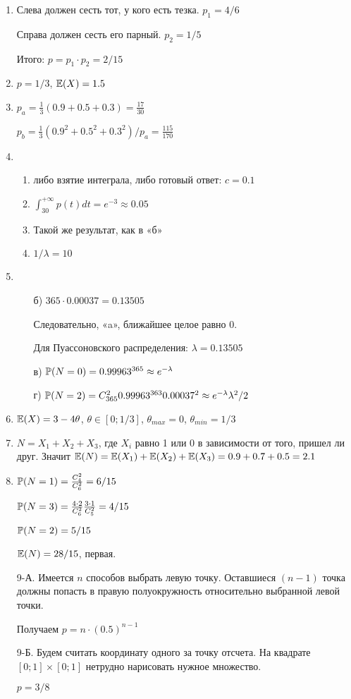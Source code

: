 \begin{enumerate}
\item Слева должен сесть тот, у кого есть тезка. $p_{1}=4/6$

Справа должен сесть его парный. $p_{2}=1/5$

Итого: $p=p_{1}\cdot p_{2}=2/15$
\item $p=1/3$, $\E(X)=1.5$
\item $p_{a}=\frac{1}{3}(0.9+0.5+0.3)=\frac{17}{30}$

$p_{b}=\frac{1}{3}(0.9^{2}+0.5^{2}+0.3^{2})/p_{a}=\frac{115}{170}$
\item
\begin{enumerate}
\item либо взятие интеграла, либо готовый ответ: $c=0.1$
\item $\int_{30}^{+\infty}p(t)dt=e^{-3}\approx 0.05$
\item Такой же результат, как в «б»
\item $1/\lambda=10$
\end{enumerate}
\item
\begin{enumerate}
\item[б)] $365\cdot 0.00037=0.13505$

Следовательно, «a», ближайшее целое равно 0.

Для Пуассоновского распределения: $\lambda=0.13505$
\item[в)] $\P(N=0)=0.99963^{365}\approx e^{-\lambda}$
\item[г)] $\P(N=2)=C_{365}^{2}0.99963^{363}0.00037^{2}\approx e^{-\lambda}\lambda^{2}/2$
\end{enumerate}
\item $\E(X)=3-4\theta$, $\theta\in[0;1/3]$, $\theta_{max}=0$, $\theta_{min}=1/3$
\item $N=X_{1}+X_{2}+X_{3}$, где $X_{i}$ равно 1 или 0 в зависимости от того, пришел ли друг. Значит $\E(N)=\E(X_{1})+\E(X_{2})+\E(X_{3})=0.9+0.7+0.5=2.1$
\item $\P(N=1)=\frac{C_{4}^{2}}{C_{6}^{2}}=6/15$

$\P(N=3)=\frac{4\cdot 2}{C_{6}^{2}}\frac{3\cdot 1}{C_{5}^{2}}=4/15$

$\P(N=2)=5/15$

$\E(N)=28/15$, первая.
\item[9-А.] Имеется $n$ способов выбрать левую точку. Оставшиеся $(n-1)$ точка должны попасть в правую полуокружность относительно выбранной левой точки.

Получаем $p=n\cdot (0.5)^{n-1}$
\item[9-Б.] Будем считать координату одного за точку отсчета. На квадрате $[0;1]\times[0;1]$ нетрудно нарисовать нужное множество.

$p=3/8$
\end{enumerate}



